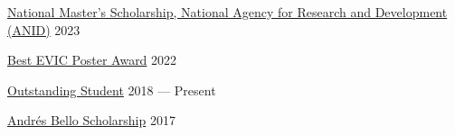 \href{https://s3.amazonaws.com/documentos.anid.cl/BecasChile/2023/MagisterNacional/POSTULANTES_MagNac_2023.pdf}{National Master's Scholarship, National Agency for Research and Development (ANID)} \hfill 2023

\href{https://www.evic.cl/?page_id=235#testimonio}{Best EVIC Poster Award} \hfill 2022

\href{https://ingenieria.uchile.cl/escuela/la-escuela/distinciones/alumnos-destacados-2022}{Outstanding Student} \hfill 2018 --- Present

\href{https://uchile.cl/dam/jcr:2c08cf3c-6d82-47c0-9996-1b67d3e4b545/1678118110N%C3%B3minaBAB_transparencia_2022.pdf}{Andrés Bello Scholarship} \hfill 2017

